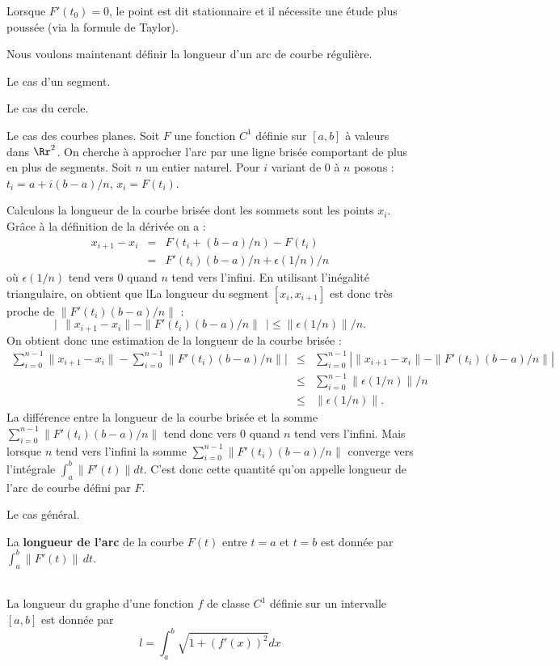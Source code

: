\documentclass[12pt, class=report,crop=false]{standalone}
\begin{document}
Lorsque $F'(t_{0}) = 0$, le point est dit stationnaire et il nécessite une étude plus poussée (via la formule de Taylor).



Nous voulons maintenant définir la longueur d'un arc de courbe réguli\`ere. 

Le cas d'un segment.

Le cas du cercle.

Le cas des courbes planes.
Soit $F$ une fonction $C^1$ définie sur $[a,b]$ \`a valeurs dans $\Rr^2$. On cherche \`a approcher l'arc par une ligne brisée comportant de plus en plus de segments. Soit $n$ un entier naturel. Pour $i$ variant de 0 \`a $n$ posons : $t_i=a+i(b-a)/n$, $x_i=F(t_i)$.


Calculons la longueur de la courbe brisée dont les sommets sont les points $x_i$.
Gr\^ace \`a la définition de la dérivée on a :
\begin{eqnarray*}
x_{i+1}-x_i&=&F(t_i+(b-a)/n)-F(t_i)\\
&=&F'(t_i)(b-a)/n+\epsilon(1/n)/n
\end{eqnarray*}
o\`u $\epsilon(1/n)$ tend vers $0$ quand $n$ tend vers l'infini. En utilisant l'inégalité triangulaire, on obtient que lLa longueur du segment $[x_i,x_{i+1}]$ est donc tr\`es proche de $\|F'(t_i)(b-a)/n\|$ :
$$
\big|~~\|x_{i+1}-x_i\|-\|F'(t_i)(b-a)/n\|~~\big|\leq \|\epsilon(1/n)\|/n.
$$
On obtient donc une estimation de la longueur de la courbe brisée :
\begin{eqnarray*}
\sum_{i=0}^{n-1}\|x_{i+1}-x_i\|-\sum_{i=0}^{n-1}\|F'(t_i)(b-a)/n\||&\leq&\sum_{i=0}^{n-1}|\|x_{i+1}-x_i\|-\|F'(t_i)(b-a)/n\||\\
&\leq&\sum_{i=0}^{n-1} \|\epsilon(1/n)\|/n\\
&\leq&\|\epsilon(1/n)\|.
\end{eqnarray*}
La différence entre la longueur de la courbe brisée et la somme $\sum_{i=0}^{n-1}\|F'(t_i)(b-a)/n\|$ tend donc vers 0 quand $n$ tend vers l'infini.
Mais lorsque $n$ tend vers l'infini la somme $\sum_{i=0}^{n-1}\|F'(t_i)(b-a)/n\|$ converge vers l'intégrale $\int_a^b\|F'(t)\|dt$. C'est donc cette quantité qu'on appelle longueur de l'arc de courbe défini par $F$.

Le cas général.
\begin{definition}
La {\bf longueur de l'arc} de la courbe $F(t)$ entre $t = a$ et $t = b$ est donnée par $\displaystyle \int_{a}^b \|F'(t)\|\, dt$.
\end{definition}

\\
La longueur du graphe d'une fonction $f$ de classe $C^1$ définie sur un intervalle $[a,b]$ est donnée par
$$l=\int_a^b \sqrt{1+(f'(x))^2}dx$$
\end{document}
